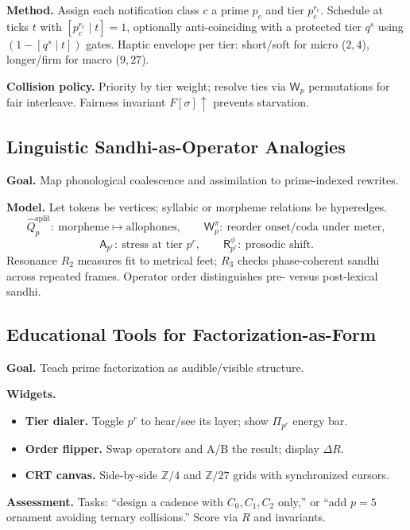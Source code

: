 \documentclass[12pt]{article}
\numberwithin{equation}{section}
\theoremstyle{plain}
\theoremstyle{definition}
\theoremstyle{remark}
\begin{document}
\noindent\textbf{Method.} Assign each notification class $c$ a prime $p_c$ and tier $p_c^{r_c}$. Schedule at ticks $t$ with $[p_c^{r_c}\mid t]=1$, optionally anti-coinciding with a protected tier $q^s$ using $(1-[q^s\mid t])$ gates. 
Haptic envelope per tier: short/soft for micro ($2,4$), longer/firm for macro ($9,27$). 

\noindent\textbf{Collision policy.} Priority by tier weight; resolve ties via $\mathsf{W}_p$ permutations for fair interleave. Fairness invariant $F[\sigma]\uparrow$ prevents starvation.

\subsection*{Linguistic Sandhi-as-Operator Analogies}
\textbf{Goal.} Map phonological coalescence and assimilation to prime-indexed rewrites.

\noindent\textbf{Model.} Let tokens be vertices; syllabic or morpheme relations be hyperedges. 
\[
\hat{Q}_p^{\mathrm{split}}:\ \text{morpheme} \mapsto \text{allophones},\qquad 
\mathsf{W}_p^{\pi}:\ \text{reorder onset/coda under meter},
\]
\[
\mathsf{A}_{p^r}:\ \text{stress at tier }p^r,\qquad 
\mathsf{R}_{p^r}^{\phi}:\ \text{prosodic shift}.
\]
Resonance $R_2$ measures fit to metrical feet; $R_3$ checks phase-coherent sandhi across repeated frames. Operator order distinguishes pre- versus post-lexical sandhi.

\subsection*{Educational Tools for Factorization-as-Form}
\textbf{Goal.} Teach prime factorization as audible/visible structure.

\noindent\textbf{Widgets.}
\begin{itemize}
\item \textbf{Tier dialer.} Toggle $p^r$ to hear/see its layer; show $\Pi_{p^r}$ energy bar.
\item \textbf{Order flipper.} Swap operators and A/B the result; display $\Delta R$.
\item \textbf{CRT canvas.} Side-by-side $\mathbb{Z}/4$ and $\mathbb{Z}/27$ grids with synchronized cursors.
\end{itemize}
\textbf{Assessment.} Tasks: “design a cadence with $C_0,C_1,C_2$ only,” or “add $p=5$ ornament avoiding ternary collisions.” Score via $R$ and invariants.
\end{document}
